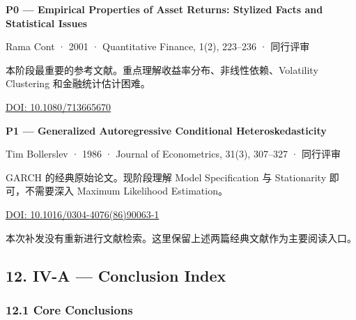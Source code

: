 \textbf{P0 --- Empirical Properties of Asset Returns: Stylized Facts and Statistical Issues}

Rama Cont · 2001 · Quantitative Finance, 1(2), 223--236 · 同行评审

本阶段最重要的参考文献。重点理解收益率分布、非线性依赖、Volatility Clustering 和金融统计估计困难。

\href{https://doi.org/10.1080/713665670}{DOI: 10.1080/713665670}

\textbf{P1 --- Generalized Autoregressive Conditional Heteroskedasticity}

Tim Bollerslev · 1986 · Journal of Econometrics, 31(3), 307--327 · 同行评审

GARCH 的经典原始论文。现阶段理解 Model Specification 与 Stationarity 即可，不需要深入 Maximum Likelihood Estimation。

\href{https://doi.org/10.1016/0304-4076(86)90063-1}{DOI: 10.1016/0304-4076(86)90063-1}

本次补发没有重新进行文献检索。这里保留上述两篇经典文献作为主要阅读入口。

\hypertarget{part-4-58-0007-iv-a-conclusion-index}{%
\subsection{12. IV-A --- Conclusion Index}\label{part-4-58-0007-iv-a-conclusion-index}}

\hypertarget{part-4-58-0007-core-conclusions}{%
\subsubsection{12.1 Core Conclusions}\label{part-4-58-0007-core-conclusions}}

